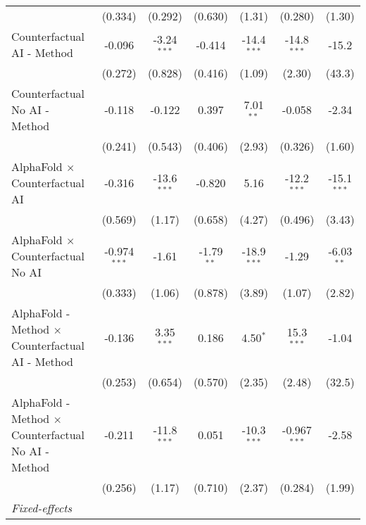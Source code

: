 \begin{tabular}{lcccccc}
                                                              & (0.334)        & (0.292)       & (0.630)      & (1.31)        & (0.280)        & (1.30)\\   
   Counterfactual AI - Method                                 & -0.096         & -3.24$^{***}$ & -0.414       & -14.4$^{***}$ & -14.8$^{***}$  & -15.2\\   
                                                              & (0.272)        & (0.828)       & (0.416)      & (1.09)        & (2.30)         & (43.3)\\   
   Counterfactual No AI - Method                              & -0.118         & -0.122        & 0.397        & 7.01$^{**}$   & -0.058         & -2.34\\   
                                                              & (0.241)        & (0.543)       & (0.406)      & (2.93)        & (0.326)        & (1.60)\\   
   AlphaFold $\times$ Counterfactual AI                       & -0.316         & -13.6$^{***}$ & -0.820       & 5.16          & -12.2$^{***}$  & -15.1$^{***}$\\   
                                                              & (0.569)        & (1.17)        & (0.658)      & (4.27)        & (0.496)        & (3.43)\\   
   AlphaFold $\times$ Counterfactual No AI                    & -0.974$^{***}$ & -1.61         & -1.79$^{**}$ & -18.9$^{***}$ & -1.29          & -6.03$^{**}$\\   
                                                              & (0.333)        & (1.06)        & (0.878)      & (3.89)        & (1.07)         & (2.82)\\   
   AlphaFold - Method $\times$ Counterfactual AI - Method     & -0.136         & 3.35$^{***}$  & 0.186        & 4.50$^{*}$    & 15.3$^{***}$   & -1.04\\   
                                                              & (0.253)        & (0.654)       & (0.570)      & (2.35)        & (2.48)         & (32.5)\\   
   AlphaFold - Method $\times$ Counterfactual No AI - Method  & -0.211         & -11.8$^{***}$ & 0.051        & -10.3$^{***}$ & -0.967$^{***}$ & -2.58\\   
                                                              & (0.256)        & (1.17)        & (0.710)      & (2.37)        & (0.284)        & (1.99)\\   
   \midrule
   \emph{Fixed-effects}\\

\end{tabular}
